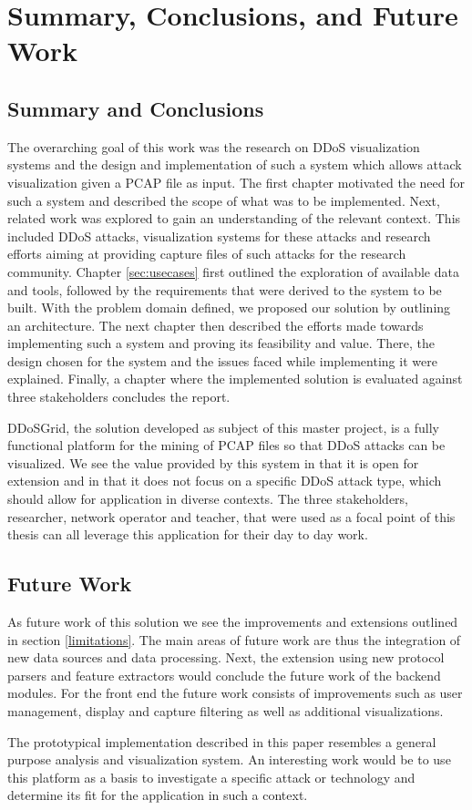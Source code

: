 \chapter{Summary, Conclusions, and Future Work} %
\section{Summary and Conclusions}
The overarching goal of this work was the research on DDoS visualization systems and the design and implementation of such a system which allows attack visualization given a PCAP file as input. The first chapter motivated the need for such a system and described the scope of what was to be implemented. Next, related work was explored to gain an understanding of the relevant context. This included DDoS attacks, visualization systems for these attacks and research efforts aiming at providing capture files of such attacks for the research community.
Chapter \ref{sec:usecases} first outlined the exploration of available data and tools, followed by the requirements that were derived to the system to be built. With the problem domain defined, we proposed our solution by outlining an architecture.
The next chapter then described the efforts made towards implementing such a system and proving its feasibility and value. There, the design chosen for the system and the issues faced while implementing it were explained.
Finally, a chapter where the implemented solution is evaluated against three stakeholders concludes the report.

DDoSGrid, the solution developed as subject of this master project, is a fully functional platform for the mining of PCAP files so that DDoS attacks can be visualized. We see the value provided by this system in that it is open for extension and in that it does not focus on a specific DDoS attack type, which should allow for application in diverse contexts. The three stakeholders, researcher, network operator and teacher, that were used as a focal point of this thesis can all leverage this application for their day to day work.

\section{Future Work}
As future work of this solution we see the improvements and extensions outlined in section \ref{limitations}. The main areas of future work are thus the integration of new data sources and data processing. Next, the extension using new protocol parsers and feature extractors would conclude the future work of the backend modules. For the front end the future work consists of improvements such as user management, display and capture filtering as well as additional visualizations.

The prototypical implementation described in this paper resembles a general purpose analysis and visualization system. An interesting work would be to use this platform as a basis to investigate a specific attack or technology and determine its fit for the application in such a context.